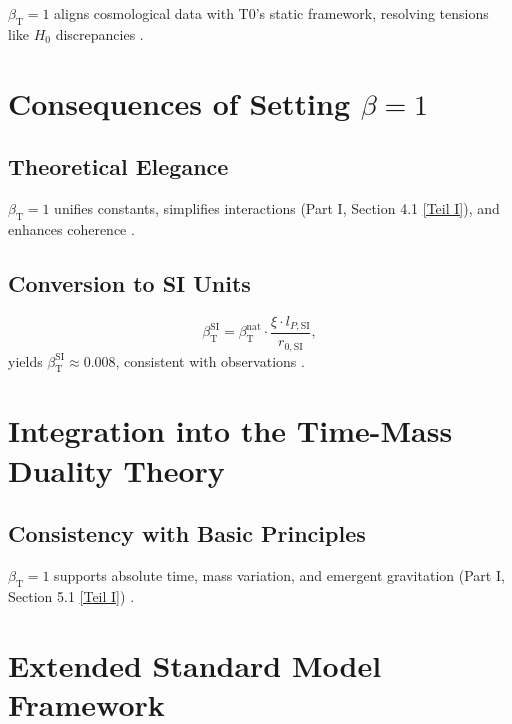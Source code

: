 \documentclass[twocolumn,aps,prl]{revtex4-2}
\newcommand{\betaT}{\beta_{\text{T}}}
\begin{document}
	\(\betaT = 1\) aligns cosmological data with T0's static framework, resolving tensions like \(H_0\) discrepancies \cite{DiValentino2021}.
	
	\section{Consequences of Setting \(\beta = 1\)}
	\label{sec:consequences_beta}
	
	\subsection{Theoretical Elegance}
	\label{subsec:theoretical_elegance}
	
	\(\betaT = 1\) unifies constants, simplifies interactions (Part I, Section 4.1 \href{https://github.com/jpascher/T0-Time-Mass-Duality/tree/main/2/pdf/English/QMRelTimeMassPart1En.pdf}{[Teil I]}), and enhances coherence \cite{pascher_alphabeta_2025}.
	
	\subsection{Conversion to SI Units}
	\label{subsec:conversion_si}
	
	\begin{equation}
		\betaT^{\text{SI}} = \betaT^{\text{nat}} \cdot \frac{\xi \cdot l_{P,\text{SI}}}{r_{0,\text{SI}}},
		\label{eq:beta_conversion}
	\end{equation}
	yields \(\betaT^{\text{SI}} \approx 0.008\), consistent with observations \cite{pascher_alphabeta_2025}.
	
	\section{Integration into the Time-Mass Duality Theory}
	\label{sec:integration_t0}
	
	\subsection{Consistency with Basic Principles}
	\label{subsec:consistency_principles}
	
	\(\betaT = 1\) supports absolute time, mass variation, and emergent gravitation (Part I, Section 5.1 \href{https://github.com/jpascher/T0-Time-Mass-Duality/tree/main/2/pdf/English/QMRelTimeMassPart1En.pdf}{[Teil I]}) \cite{pascher_lagrange_2025}.
	
	\section{Extended Standard Model Framework}
	\label{sec:extended_standard_model}
	
\end{document}
